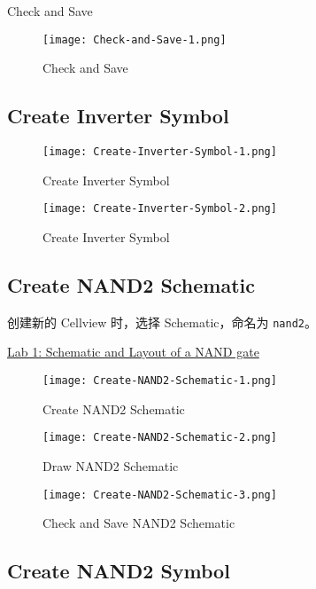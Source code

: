 \documentclass{theme-2614084}
\begin{document}
Check and Save

\begin{figure}[H]
  \centering
  \texttt{[image: Check-and-Save-1.png]}
  \caption{Check and Save}
\end{figure}

\subsection{Create Inverter Symbol}

\begin{figure}[H]
  \centering
  \texttt{[image: Create-Inverter-Symbol-1.png]}
  \caption{Create Inverter Symbol}
\end{figure}

\begin{figure}[H]
  \centering
  \texttt{[image: Create-Inverter-Symbol-2.png]}
  \caption{Create Inverter Symbol}
\end{figure}

\subsection{Create NAND2 Schematic}

创建新的 Cellview 时，选择 Schematic，命名为 \texttt{nand2}。

\href{http://www.doe.carleton.ca/~shams/ELEC4708/Lab1SchematicTut2014.pdf}{Lab 1: Schematic and Layout of a NAND gate}

\begin{figure}[H]
  \centering
  \texttt{[image: Create-NAND2-Schematic-1.png]}
  \caption{Create NAND2 Schematic}
\end{figure}

\begin{figure}[H]
  \centering
  \texttt{[image: Create-NAND2-Schematic-2.png]}
  \caption{Draw NAND2 Schematic}
\end{figure}

\begin{figure}[H]
  \centering
  \texttt{[image: Create-NAND2-Schematic-3.png]}
  \caption{Check and Save NAND2 Schematic}
\end{figure}

\subsection{Create NAND2 Symbol}
\end{document}
